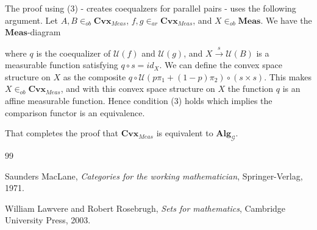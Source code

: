 \documentclass[11pt]{amsart}    %
\newcommand{\G}{\mathcal{G}}
\newcommand{\U}{\mathcal{U}}
\begin{document}
The proof using (3) - creates coequalzers for parallel pairs - uses the following argument.
Let $A, B \in_{ob} \mathbf{Cvx}_{Meas}$,  $f,g \in_{ar} \mathbf{Cvx}_{Meas}$, and \mbox{$X \in_{ob} \mathbf{Meas}$}. We have the $\mathbf{Meas}$-diagram
\begin{center}
\end{center}
where $q$ is the coequalizer of $\U(f)$ and $\U(g)$, and $X \xrightarrow{s} \U(B)$ is a measurable function satisfying $q \circ s=id_X$. 
We can define the convex space structure on $X$ as the composite $q \circ \mathcal{U}(p \pi_1 + (1-p) \pi_2) \circ (s \times s)$.  This makes $X \in_{ob} \mathbf{Cvx}_{Meas}$, and with this convex space structure on $X$ the function $q$ is an affine measurable function.
 Hence condition (3) holds which implies the comparison functor is an equivalence.

 That completes the proof that  $\mathbf{Cvx}_{Meas}$ is equivalent to $\mathbf{Alg}_{\G}$.

\vspace{.3in}


\begin{thebibliography}{99}

  Saunders MacLane,
  \emph{Categories for the working mathematician},
  Springer-Verlag,
  1971.

  William Lawvere and Robert Rosebrugh,
  \emph{Sets for mathematics},
  Cambridge University Press,
  2003.
\end{thebibliography}
\end{document}
